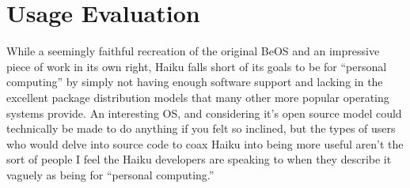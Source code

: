 \documentclass{article}
\begin{document}
\section{Usage Evaluation}

While a seemingly faithful recreation of the original BeOS and an
impressive piece of work in its own right, Haiku falls short of its
goals to be for ``personal computing'' by simply not having enough
software support and lacking in the excellent package distribution
models that many other more popular operating systems provide.  An
interesting OS, and considering it's open source model could
technically be made to do anything if you felt so inclined, but the
types of users who would delve into source code to coax Haiku into
being more useful aren't the sort of people I feel the Haiku
developers are speaking to when they describe it vaguely as being for
``personal computing.''

{}

\end{document}
